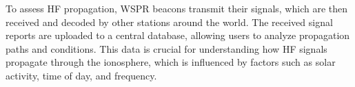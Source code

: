 To assess HF propagation, WSPR beacons transmit their signals, which are then received and decoded by other stations around the world. The received signal reports are uploaded to a central database, allowing users to analyze propagation paths and conditions. This data is crucial for understanding how HF signals propagate through the ionosphere, which is influenced by factors such as solar activity, time of day, and frequency.

